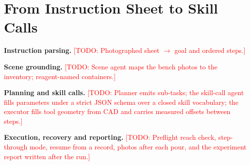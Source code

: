 \documentclass[letterpaper, 10pt, journal, twoside]{IEEEtran}}
\newcommand{\todo}[1]{\textcolor{red}{[TODO: #1]}}
\begin{document}
\section{From Instruction Sheet to Skill Calls}
\label{sec:planning}

\textbf{Instruction parsing.} \todo{Photographed sheet $\rightarrow$
goal and ordered steps.}

\textbf{Scene grounding.} \todo{Scene agent maps the bench photos to the
inventory; reagent-named containers.}

\textbf{Planning and skill calls.} \todo{Planner emits sub-tasks; the
skill-call agent fills parameters under a strict JSON schema over a closed
skill vocabulary; the executor fills tool geometry from CAD and carries
measured offsets between steps.}

\textbf{Execution, recovery and reporting.} \todo{Preflight reach check,
step-through mode, resume from a record, photos after each pour, and the
experiment report written after the run.}

%
%
\end{document}

